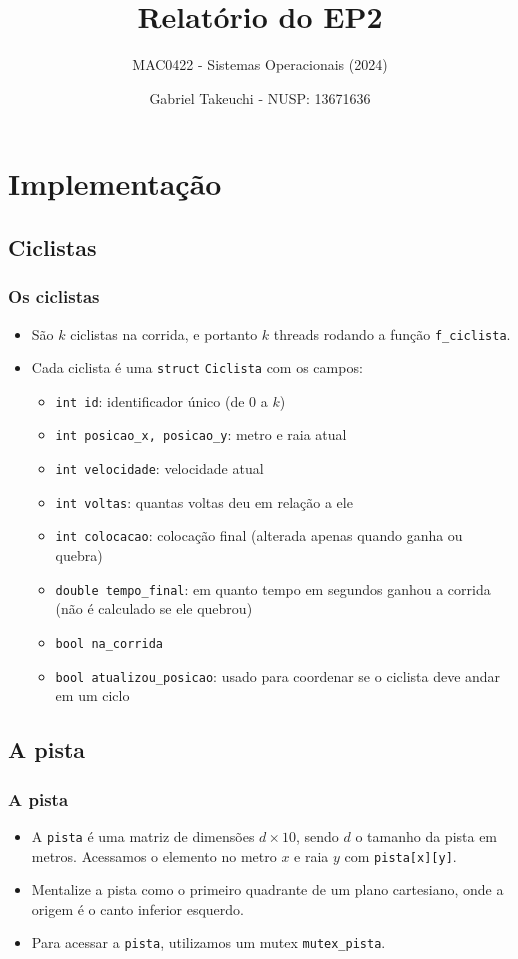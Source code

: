 \documentclass{beamer}
\title{Relatório do EP2}
\subtitle{MAC0422 - Sistemas Operacionais (2024)}
\author{Gabriel Takeuchi - NUSP: 13671636}
\date{}
\begin{document}
\begin{frame}
  \titlepage
\end{frame}

\section{Implementação}

\subsection{Ciclistas}
\begin{frame}
  \frametitle{Os ciclistas}
  \begin{itemize}
    \item São $k$ ciclistas na corrida, e portanto $k$ threads rodando a função \texttt{f\_ciclista}.
    \item Cada ciclista é uma \texttt{struct} \texttt{Ciclista} com os campos:
    \begin{itemize}
      \item \texttt{int id}: identificador único (de 0 a $k$)
      \item \texttt{int posicao\_x, posicao\_y}: metro e raia atual
      \item \texttt{int velocidade}: velocidade atual
      \item \texttt{int voltas}: quantas voltas deu em relação a ele
      \item \texttt{int colocacao}: colocação final (alterada apenas quando ganha ou quebra)
      \item \texttt{double tempo\_final}: em quanto tempo em segundos ganhou a corrida (não é calculado se ele quebrou)
      \item \texttt{bool na\_corrida}
      \item \texttt{bool atualizou\_posicao}: usado para coordenar se o ciclista deve andar em um ciclo
    \end{itemize}
  \end{itemize}
\end{frame}

\subsection{A pista}
\begin{frame}
  \frametitle{A pista}
  \begin{itemize}
    \item A \texttt{pista} é uma matriz de dimensões $d \times 10$, sendo $d$ o tamanho da pista em metros. Acessamos o elemento no metro $x$ e raia $y$ com \texttt{pista[x][y]}.
    \item Mentalize a pista como o primeiro quadrante de um plano cartesiano, onde a origem é o canto inferior esquerdo.
    \item Para acessar a \texttt{pista}, utilizamos um mutex \texttt{mutex\_pista}.
  \end{itemize}
\end{frame}
\end{document}
